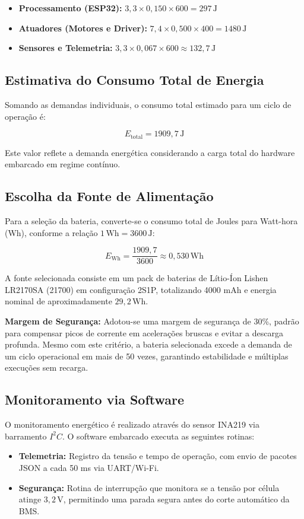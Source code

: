 \begin{itemize}
    \item \textbf{Processamento (ESP32):} $3,3 \times 0,150 \times 600 = 297\,\mathrm{J}$
    \item \textbf{Atuadores (Motores e Driver):} $7,4 \times 0,500 \times 400 = 1480\,\mathrm{J}$
    \item \textbf{Sensores e Telemetria:} $3,3 \times 0,067 \times 600 \approx 132,7\,\mathrm{J}$
\end{itemize}

\subsection{Estimativa do Consumo Total de Energia}

Somando as demandas individuais, o consumo total estimado para um ciclo de operação é:

\[
E_{\mathrm{total}} = 1909,7\,\mathrm{J}
\]

Este valor reflete a demanda energética considerando a carga total do hardware embarcado em regime contínuo.

\subsection{Escolha da Fonte de Alimentação}

Para a seleção da bateria, converte-se o consumo total de Joules para Watt-hora (Wh), conforme a relação $1\,\mathrm{Wh} = 3600\,\mathrm{J}$:

\[
E_{\mathrm{Wh}} = \frac{1909,7}{3600} \approx 0,530\,\mathrm{Wh}
\]

A fonte selecionada consiste em um pack de baterias de Lítio-Íon Lishen LR2170SA (21700) em configuração 2S1P, totalizando 4000 mAh e energia nominal de aproximadamente $29,2\,\mathrm{Wh}$.

\textbf{Margem de Segurança:} Adotou-se uma margem de segurança de 30\%, padrão para compensar picos de corrente em acelerações bruscas e evitar a descarga profunda. Mesmo com este critério, a bateria selecionada excede a demanda de um ciclo operacional em mais de 50 vezes, garantindo estabilidade e múltiplas execuções sem recarga.

\subsection{Monitoramento via Software}

O monitoramento energético é realizado através do sensor INA219 via barramento $I^2C$. O software embarcado executa as seguintes rotinas:
\begin{itemize}
    \item \textbf{Telemetria:} Registro da tensão e tempo de operação, com envio de pacotes JSON a cada 50 ms via UART/Wi-Fi.
    \item \textbf{Segurança:} Rotina de interrupção que monitora se a tensão por célula atinge $3,2\,\mathrm{V}$, permitindo uma parada segura antes do corte automático da BMS.
\end{itemize}

